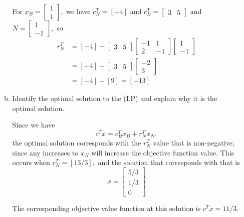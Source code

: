 \documentclass{article}
\begin{document}
\begin{enumerate}
\begin{enumerate}[a)]
\begin{soln}
					For $x_B=\begin{bmatrix}
						1 \\ 1
					\end{bmatrix},$ we have $c_N^T=[-4]$ and $c_B^T=\begin{bmatrix}
						3 & 5
					\end{bmatrix}$ and $N=\begin{bmatrix}
						1 \\ -1
					\end{bmatrix},$ so 
					\begin{align*}
						r_N^T &= [-4] - \begin{bmatrix}
							3 & 5
						\end{bmatrix}\begin{bmatrix}
							-1 & 1 \\
							2 & -1
						\end{bmatrix}\begin{bmatrix}
							1 \\ -1
						\end{bmatrix} \\
						&= [-4] - \begin{bmatrix}
							3 & 5
						\end{bmatrix}\begin{bmatrix}
							-2 \\ 3
						\end{bmatrix} \\
						&= [-4] - [9] = [-13]
					\end{align*}

				\end{soln}

			\item Identify the optimal solution to the (LP) and explain why it is the optimal solution.
				\begin{soln}
					Since we have \[c^T x = c_B^T x_B + r_N^T x_N, \] the optimal solution corresponds with the $r_N^T$ value that is non-negative, since any increases to $x_N$ will increase the objective function value. This occurs when $r_N^T=[13/3],$ and the solution that corresponds with that is \[x=\boxed{\begin{bmatrix}
						5/3 \\ 1/3 \\ 0
				\end{bmatrix}}\]

				The corresponding objective value function at this solution is $c^Tx=\boxed{11/3}.$
				\end{soln}
				

\end{enumerate}
\end{enumerate}
\end{document}

